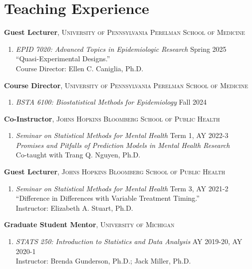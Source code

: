 \documentclass[letterpaper,11pt]{article} %
\begin{document}
	
	\section*{Teaching Experience}
        
        \textbf{Guest Lecturer}, \textsc{University of Pennsylvania Perelman School of Medicine}
        \begin{enumerate}
            \item \textit{EPID 7020: Advanced Topics in Epidemiologic Research} \hfill Spring 2025 \\
            ``Quasi-Experimental Designs.'' \\
            Course Director: Ellen C. Caniglia, Ph.D.
        \end{enumerate}
	
		\textbf{Course Director}, \textsc{University of Pennsylvania Perelman School of Medicine}
		\begin{enumerate}
			\item[] \textit{BSTA 6100: Biostatistical Methods for Epidemiology} \hfill Fall 2024
		\end{enumerate}
	
		\noindent \textbf{Co-Instructor}, \textsc{Johns Hopkins Bloomberg School of Public Health}
		\begin{enumerate}
			\item[] \textit{Seminar on Statistical Methods for Mental Health} \hfill Term 1, AY 2022-3 \\
			\textit{Promises and Pitfalls of Prediction Models in Mental Health Research} \\
			Co-taught with Trang Q. Nguyen, Ph.D.
		\end{enumerate}
		
		\noindent \textbf{Guest Lecturer}, \textsc{Johns Hopkins Bloomberg School of Public Health}
		\begin{enumerate}
			\item[] \textit{Seminar on Statistical Methods for Mental Health} \hfill Term 3, AY 2021-2 \\
			``Difference in Differences with Variable Treatment Timing.'' \\
			Instructor: Elizabeth A. Stuart, Ph.D.
		\end{enumerate}
		
 		\noindent \textbf{Graduate Student Mentor}, \textsc{University of Michigan} 
 		\begin{enumerate}
 			\item \textit{STATS 250: Introduction to Statistics and Data Analysis} \hfill AY 2019-20, AY 2020-1 \\
 			Instructor: Brenda Gunderson, Ph.D.; Jack Miller, Ph.D.
 		\end{enumerate}
	
\end{document}
